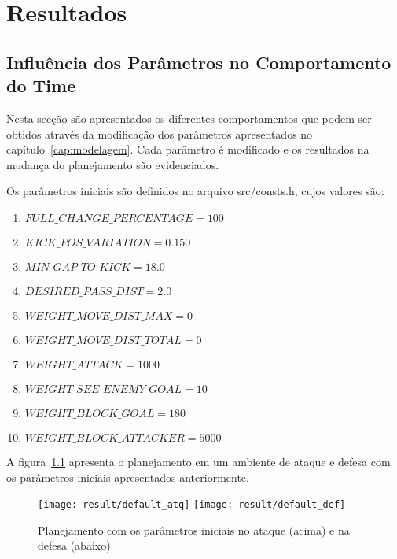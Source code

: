 \chapter{Resultados}\label{cap:resultados}



\section{Influência dos Parâmetros no Comportamento do Time}

Nesta secção são apresentados os diferentes comportamentos
que podem ser obtidos através da modificação dos parâmetros
apresentados no capítulo~\ref{cap:modelagem}. Cada parâmetro
é modificado e os resultados na mudança do planejamento são
evidenciados.

Os parâmetros iniciais são definidos no arquivo src/consts.h, %
cujos valores são:

\begin{enumerate}
  \item $FULL{\_}CHANGE{\_}PERCENTAGE = 100$
  \item $KICK{\_}POS{\_}VARIATION = 0.150$
  \item $MIN{\_}GAP{\_}TO{\_}KICK = 18.0$
  \item $DESIRED{\_}PASS{\_}DIST = 2.0$
  \item $WEIGHT{\_}MOVE{\_}DIST{\_}MAX = 0$
  \item $WEIGHT{\_}MOVE{\_}DIST{\_}TOTAL = 0$
  \item $WEIGHT{\_}ATTACK = 1000$
  \item $WEIGHT{\_}SEE{\_}ENEMY{\_}GOAL = 10$
  \item $WEIGHT{\_}BLOCK{\_}GOAL = 180$
  \item $WEIGHT{\_}BLOCK{\_}ATTACKER = 5000$
\end{enumerate}

A figura~\ref{fig:default} apresenta o planejamento em um
ambiente de ataque e defesa com os parâmetros iniciais
apresentados anteriormente.

\begin{figure}[H]
  \centering
  \texttt{[image: result/default\_atq]}
  \texttt{[image: result/default\_def]}
  \caption{Planejamento com os parâmetros iniciais no
           ataque (acima) e na defesa (abaixo)}\label{fig:default}
\end{figure}










